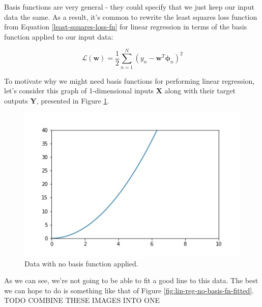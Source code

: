 
Basis functions are very general - they could specify that we just keep our input data the same. As a result, it's common to rewrite the least squares loss function from Equation \ref{least-squares-loss-fn} for linear regression in terms of the basis function applied to our input data:

\begin{equation} \label{least-squares-loss-fn-w-basis}
    \mathcal{L}(\textbf{w}) = \frac{1}{2} \sum_{n=1}^{N} (y_{n} - \textbf{w}^{T}\boldsymbol{\phi}_{n})^2
\end{equation}

To motivate why we might need basis functions for performing linear regression, let's consider this graph of 1-dimensional inputs \textbf{X} along with their target outputs \textbf{Y}, presented in Figure \ref{fig:lin-reg-no-basis-fn}.

\begin{figure}
    \centering
    \includegraphics[width=0.5\paperwidth]{../LinearRegression/fig/lin_reg_no_basis_fn_GEN.jpg}
    \caption{Data with no basis function applied.}
    \label{fig:lin-reg-no-basis-fn}
\end{figure}

As we can see, we're not going to be able to fit a good line to this data. The best we can hope to do is something like that of Figure \ref{fig:lin-reg-no-basis-fn-fitted}. TODO COMBINE THESE IMAGES INTO ONE

